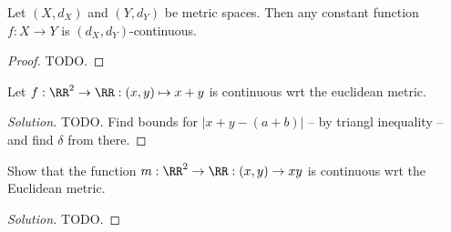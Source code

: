 \begin{proposition}
  Let $(X,d_X)$ and $(Y,d_Y)$ be metric spaces. Then any constant function
  $f:X\to Y$ is $(d_X,d_Y)$-continuous.
  \label{prop:constContinuity}
\end{proposition}
\begin{proof}
  TODO.
\end{proof}

\begin{example}
  Let $f:\RR^2\to\RR: (x,y)\mapsto x+y$ is continuous wrt the euclidean metric.
\end{example}
\begin{proof}[Solution]
  TODO. Find bounds for $|x+y-(a+b)|$ -- by triangl inequality -- and find
  $\delta$ from there.
\end{proof}
\begin{exercise}
  Show that the function $m:\RR^2\to\RR:(x,y)\to xy$ is continuous wrt the
  Euclidean metric.
  \label{ex:W3L1LastExercise}
\end{exercise}
\begin{proof}[Solution]
  TODO.
\end{proof}
